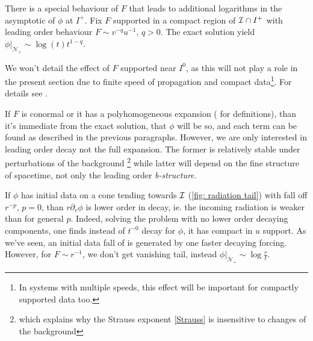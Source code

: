 \documentclass[11pt, oneside]{amsart}
\begin{document}
	\begin{remark}\label{log from corner}
	There is a special behaviour of $F$ that leads to additional logarithms in the asymptotic of $\phi$ at $I^+$. Fix $F$ supported in a compact region of $\mathcal{I}\cap I^+$ with leading order behaviour $F\sim v^{-q}u^{-1},\,q>0$. The exact solution yield $\phi|_{\mathcal{N}_+}\sim\log(t)t^{1-q}$.
	\end{remark}
	
	We won't detail the effect of $F$ supported near $I^0$, as this will not play a role in the present section due to finite speed of propagation and compact data\footnote{In systems with multiple speeds, this effect will be important for compactly supported data too.}. For details see \cite{hintz_stability_2020}. 
	
	If $F$ is conormal or it has a polyhomogeneous expansion (\cite{baskin_asymptotics_2018} for definitions), than it's immediate from the exact solution, that $\phi$ will be so, and each term can be found as described in the previous paragraphs. However, we are only interested in leading order decay not the full expansion. The former is relatively stable under perturbations of the background \footnote{which explains why the Strauss exponent \cref{Strauss} is insensitive to changes of the background} while latter will depend on the fine structure of spacetime, not only the leading order \textit{b-structure}.
	

	
	\begin{remark}
		If $\phi$ has initial data on a cone tending towards $\mathcal{I}$ (\cref{fig: radiation tail}) with fall off $r^{-p},\,p=0$, than $r\partial_v\phi$ is lower order in decay, ie. the incoming radiation is weaker than for general $p$. Indeed, solving the problem with no lower order decaying components, one finds instead of $t^{-0}$ decay for $\phi$, it has compact in $u$ support. As we've seen, an initial data fall of is generated by one faster decaying forcing. However, for $F\sim r^{-1}$, we don't get vanishing tail, instead $\phi|_{\mathcal{N}_+}\sim \log\frac{r}{t}$.
	\end{remark}
	
	\begin{figure}[h]
	\end{figure}
\end{document}
